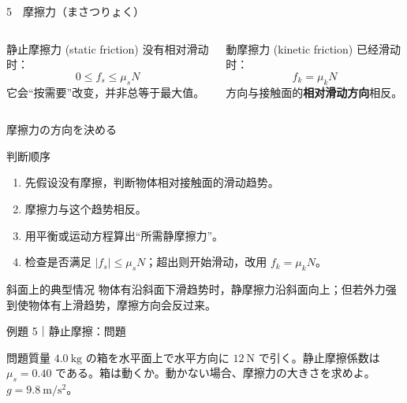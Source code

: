 \documentclass[notheorems,aspectratio=169]{beamer}
\newcommand{\key}[1]{\textbf{\color{ChinaRed}#1}}
\newcommand{\en}[1]{\textcolor{GraphGray}{\scriptsize(#1)}}
\newcommand{\qcard}[1]{%
  \begin{block}{問題}\centering\large #1\end{block}}
\begin{document}
\begin{frame}{5　摩擦力（まさつりょく）}
\begin{columns}[T]
\begin{block}{静止摩擦力 \en{static friction}}
没有相对滑动时：
\[
0\le f_s\le \mu_s N
\]
它会“按需要”改变，并非总等于最大值。
\end{block}
\begin{alertblock}{動摩擦力 \en{kinetic friction}}
已经滑动时：
\[
f_k=\mu_k N
\]
方向与接触面的\key{相对滑动方向}相反。
\end{alertblock}
\end{columns}
\vfill
\begin{center}
\end{center}
\end{frame}

\begin{frame}{摩擦力の方向を決める}
\begin{block}{判断顺序}
\begin{enumerate}
  \item 先假设没有摩擦，判断物体相对接触面的滑动趋势。
  \item 摩擦力与这个趋势相反。
  \item 用平衡或运动方程算出“所需静摩擦力”。
  \item 检查是否满足 $|f_s|\le\mu_sN$；超出则开始滑动，改用 $f_k=\mu_kN$。
\end{enumerate}
\end{block}
\begin{alertblock}{斜面上的典型情况}
物体有沿斜面下滑趋势时，静摩擦力沿斜面向上；但若外力强到使物体有上滑趋势，摩擦方向会反过来。
\end{alertblock}
\end{frame}

\begin{frame}{例題 5｜静止摩擦：問題}
\vfill
\qcard{質量 $4.0\ \mathrm{kg}$ の箱を水平面上で水平方向に $12\ \mathrm N$ で引く。静止摩擦係数は $\mu_s=0.40$ である。箱は動くか。動かない場合、摩擦力の大きさを求めよ。$g=9.8\ \mathrm{m/s^2}$。}
\vfill
\end{frame}
\end{document}
